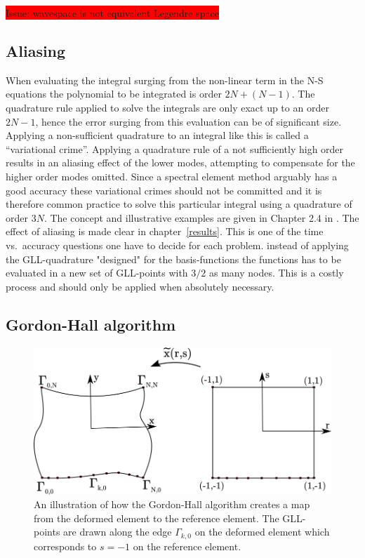 \colorbox{red}{Issue: wavespace is not equivalent Legendre space}


\subsection{Aliasing}

When evaluating the integral surging from the non-linear term in the N-S equations 
the polynomial to be integrated is order $2N+(N-1)$. The quadrature rule applied to solve the 
integrals are only exact up to an order $2N-1$, hence the error surging from this evaluation 
can be of significant size. Applying a non-sufficient quadrature to an integral like this is called a ``variational
crime''. Applying a quadrature rule of a not sufficiently high order results in an 
aliasing effect of the lower modes, attempting to compensate for the higher order modes omitted. 
Since a spectral element method arguably has a good accuracy these variational crimes should 
not be committed and it is therefore common practice to solve this particular integral using a
quadrature of order $3N$. The concept and illustrative examples are given in Chapter 2.4 in 
\cite{Karniadakis}. The effect of aliasing is made clear in chapter~\ref{results}.
This is one of the time vs.\ accuracy questions one have to decide for each problem. 
instead of applying the GLL-quadrature "designed" for the basis-functions the functions
has to be evaluated in a new set of GLL-points with $3/2$ as many nodes. This is a costly 
process and should only be applied when absolutely necessary. 


\subsection{Gordon-Hall algorithm} \label{GH}

%
\begin{figure}[h]
	\centering
	\includegraphics[width=1.0\textwidth]{Figures/GordonHall5.png}
	\caption{An illustration of how the Gordon-Hall algorithm creates a map from the 
    deformed element to the reference element. The GLL-points are drawn along the edge
    $\Gamma_{k,0}$ on the deformed element which corresponds to $s=-1$ on the reference
    element.}
	\label{fig:cHfilter}
\end{figure}
%

